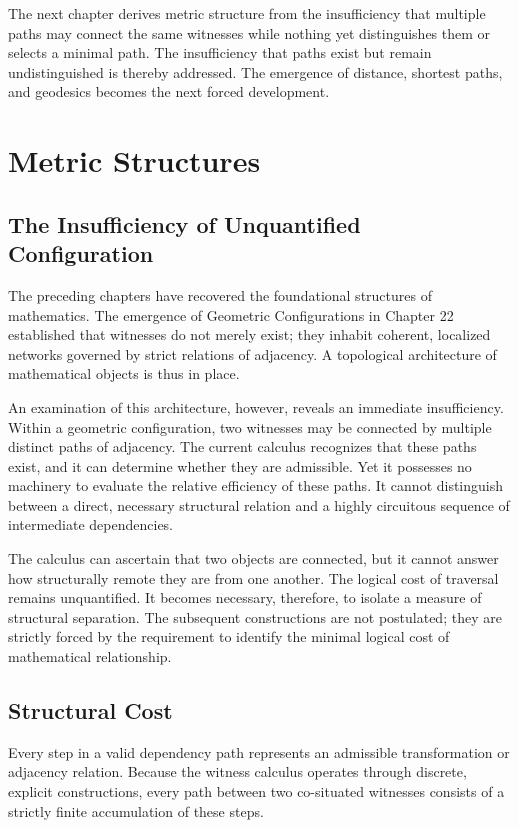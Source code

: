 \documentclass[12pt,anyside]{book}
\begin{document}
\begin{futurework}
The next chapter derives metric structure from the insufficiency that multiple paths may connect the same witnesses while nothing yet distinguishes them or selects a minimal path. The insufficiency that paths exist but remain undistinguished is thereby addressed. The emergence of distance, shortest paths, and geodesics becomes the next forced development.
\end{futurework}

\chapter{Metric Structures}

\section{The Insufficiency of Unquantified Configuration}
The preceding chapters have recovered the foundational structures of mathematics. The emergence of Geometric Configurations in Chapter 22 established that witnesses do not merely exist; they inhabit coherent, localized networks governed by strict relations of adjacency. A topological architecture of mathematical objects is thus in place.

An examination of this architecture, however, reveals an immediate insufficiency. Within a geometric configuration, two witnesses may be connected by multiple distinct paths of adjacency. The current calculus recognizes that these paths exist, and it can determine whether they are admissible. Yet it possesses no machinery to evaluate the relative efficiency of these paths. It cannot distinguish between a direct, necessary structural relation and a highly circuitous sequence of intermediate dependencies. 

The calculus can ascertain that two objects are connected, but it cannot answer how structurally remote they are from one another. The logical cost of traversal remains unquantified. It becomes necessary, therefore, to isolate a measure of structural separation. The subsequent constructions are not postulated; they are strictly forced by the requirement to identify the minimal logical cost of mathematical relationship.

\section{Structural Cost}
Every step in a valid dependency path represents an admissible transformation or adjacency relation. Because the witness calculus operates through discrete, explicit constructions, every path between two co-situated witnesses consists of a strictly finite accumulation of these steps. 
\end{document}
